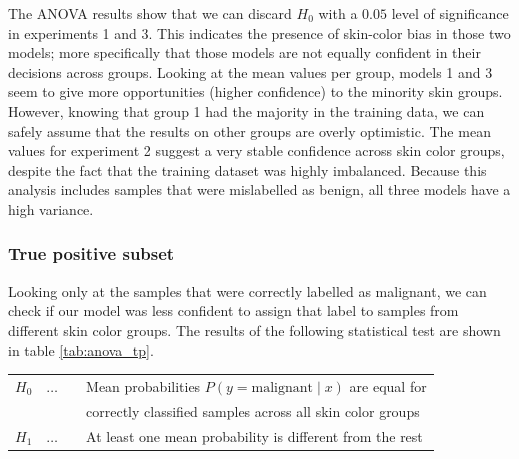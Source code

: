 The ANOVA results show that we can discard $H_0$ with a $0.05$ level of significance in experiments 1 and 3. This indicates the presence of skin-color bias in those two models; more specifically that those models are not equally confident in their decisions across groups. Looking at the mean values per group, models 1 and 3 seem to give more opportunities (higher confidence) to the minority skin groups. However, knowing that group 1 had the majority in the training data, we can safely assume that the results on other groups are overly optimistic. The mean values for experiment 2 suggest a very stable confidence across skin color groups, despite the fact that the training dataset was highly imbalanced. Because this analysis includes samples that were mislabelled as benign, all three models have a high variance.



\subsubsection{True positive subset}

Looking only at the samples that were correctly labelled as malignant, we can check if our model was less confident to assign that label to samples from different skin color groups. The results of the following statistical test are shown in table \ref{tab:anova_tp}.

\begin{center}
\begin{tabular}{rl}
$H_0 \quad\hdots\quad$  & Mean probabilities $P(y=\text{malignant} \mid x)$ are equal for \\
                        & correctly classified samples across all skin color groups \vspace{0.3em} \\
$H_1\quad\hdots\quad$   & At least one mean probability is different from the rest \\
\end{tabular}
\end{center}

